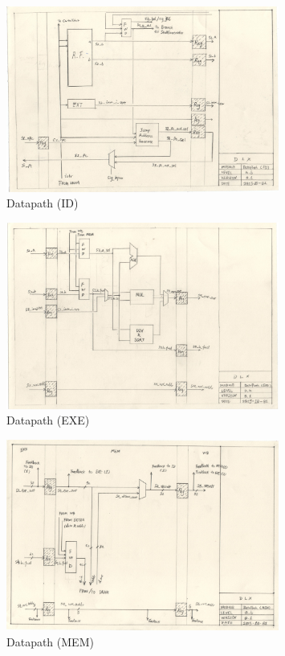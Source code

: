 \begin{figure}[Ht]
    \centering
    \includegraphics[width=0.8\textwidth]{fig/dp2.jpg}
    \caption{Datapath (ID)}
    \label{fig:dp2}
\end{figure}
\begin{figure}[Ht]
    \centering
    \includegraphics[width=0.8\textwidth]{fig/dp3.jpg}
    \caption{Datapath (EXE)}
    \label{fig:dp3}
\end{figure}
\begin{figure}[Ht]
    \centering
    \includegraphics[width=0.8\textwidth]{fig/dp4.jpg}
    \caption{Datapath (MEM)}
    \label{fig:dp4}
\end{figure}
